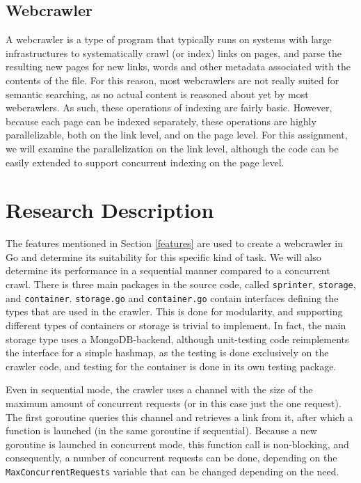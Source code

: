 \documentclass[]{article}
\begin{document}
\subsection{Webcrawler}\label{webcrawler}

A webcrawler is a type of program that typically runs on systems with
large infrastructures to systematically crawl (or index) links on pages,
and parse the resulting new pages for new links, words and other
metadata associated with the contents of the file. For this reason, most
webcrawlers are not really suited for semantic searching, as no actual
content is reasoned about yet by most webcrawlers. As such, these
operations of indexing are fairly basic. However, because each page can
be indexed separately, these operations are highly parallelizable, both
on the link level, and on the page level. For this assignment, we will
examine the parallelization on the link level, although the code can be
easily extended to support concurrent indexing on the page level.

\section{Research Description}\label{research-description}

The features mentioned in Section \ref{features} are used to create a
webcrawler in Go and determine its suitability for this specific kind of
task. We will also determine its performance in a sequential manner
compared to a concurrent crawl. There is three main packages in the
source code, called \texttt{sprinter}, \texttt{storage}, and
\texttt{container}. \texttt{storage.go} and \texttt{container.go}
contain interfaces defining the types that are used in the crawler. This
is done for modularity, and supporting different types of containers or
storage is trivial to implement. In fact, the main storage type uses a
MongoDB-backend, although unit-testing code reimplements the interface
for a simple hashmap, as the testing is done exclusively on the crawler
code, and testing for the container is done in its own testing package.

Even in sequential mode, the crawler uses a channel with the size of the
maximum amount of concurrent requests (or in this case just the one
request). The first goroutine queries this channel and retrieves a link
from it, after which a function is launched (in the same goroutine if
sequential). Because a new goroutine is launched in concurrent mode,
this function call is non-blocking, and consequently, a number of
concurrent requests can be done, depending on the
\texttt{MaxConcurrentRequests} variable that can be changed depending on
the need.
\end{document}
